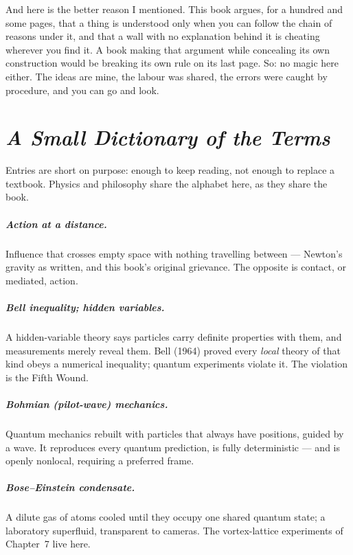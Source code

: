 \documentclass[fontsize=11pt,paper=a4,pagesize=auto,parskip=half-]{scrbook}
\begin{document}
And here is the better reason I mentioned. This book argues, for a hundred and some pages, that a thing is understood only when you can follow the chain of reasons under it, and that a wall with no explanation behind it is cheating wherever you find it. A book making that argument while concealing its own construction would be breaking its own rule on its last page. So: no magic here either. The ideas are mine, the labour was shared, the errors were caught by procedure, and you can go and look.

\appendix

\chapter{\emph{A Small Dictionary of the Terms}}

Entries are short on purpose: enough to keep reading, not enough to replace a textbook. Physics and philosophy share the alphabet here, as they share the book.

\paragraph{Action at a distance.} Influence that crosses empty space with nothing travelling between --- Newton's gravity as written, and this book's original grievance. The opposite is contact, or mediated, action.

\paragraph{Bell inequality; hidden variables.} A hidden-variable theory says particles carry definite properties with them, and measurements merely reveal them. Bell (1964) proved every \emph{local} theory of that kind obeys a numerical inequality; quantum experiments violate it. The violation is the Fifth Wound.

\paragraph{Bohmian (pilot-wave) mechanics.} Quantum mechanics rebuilt with particles that always have positions, guided by a wave. It reproduces every quantum prediction, is fully deterministic --- and is openly nonlocal, requiring a preferred frame.

\paragraph{Bose--Einstein condensate.} A dilute gas of atoms cooled until they occupy one shared quantum state; a laboratory superfluid, transparent to cameras. The vortex-lattice experiments of Chapter~7 live here.
\end{document}
